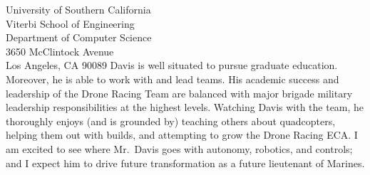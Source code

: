 \documentclass[10pt]{wrceletter}
\begin{document}
\begin{letter}{%
University of Southern California\\
Viterbi School of Engineering\\
Department of Computer Science\\
3650 McClintock Avenue\\
Los Angeles, CA 90089}
Davis is well situated to pursue graduate education. Moreover, he is able to work with and lead teams.  His academic success and leadership of the Drone Racing Team are balanced with major brigade military leadership responsibilities at the highest levels. Watching Davis with the team, he thoroughly enjoys (and is grounded by) teaching others about quadcopters, helping them out with builds, and attempting to grow the Drone Racing ECA.  I am excited to see where Mr.~Davis goes with autonomy, robotics, and controls; and I expect him to drive future transformation as a future lieutenant of Marines.

\closing{~} %

\end{letter}
\end{document}
